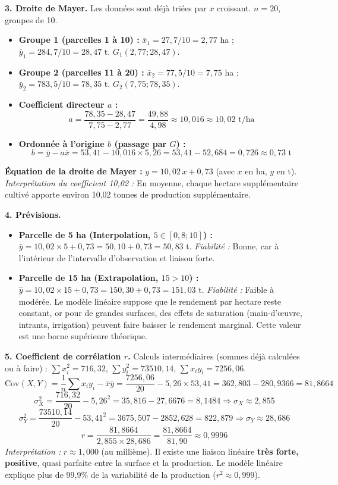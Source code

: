 \documentclass[11pt]{article}
\begin{document}
\begin{exoresolu}
\textbf{3. Droite de Mayer.}
Les données sont déjà triées par $x$ croissant. $n=20$, groupes de 10.
\begin{itemize}
    \item \textbf{Groupe 1 (parcelles 1 à 10) :}
    $\bar{x}_1 = 27,7 / 10 = 2,77$ ha ; $\bar{y}_1 = 284,7 / 10 = 28,47$ t. $G_1(2,77 ; 28,47)$.
    \item \textbf{Groupe 2 (parcelles 11 à 20) :}
    $\bar{x}_2 = 77,5 / 10 = 7,75$ ha ; $\bar{y}_2 = 783,5 / 10 = 78,35$ t. $G_2(7,75 ; 78,35)$.
    \item \textbf{Coefficient directeur $a$ :}
    \[ a = \frac{78,35 - 28,47}{7,75 - 2,77} = \frac{49,88}{4,98} \approx 10,016 \approx 10,02 \text{ t/ha} \]
    \item \textbf{Ordonnée à l'origine $b$ (passage par $G$) :}
    \[ b = \bar{y} - a\bar{x} = 53,41 - 10,016 \times 5,26 = 53,41 - 52,684 = 0,726 \approx 0,73 \text{ t} \]
\end{itemize}
\textbf{Équation de la droite de Mayer :} $\boxed{y = 10,02\,x + 0,73}$ (avec $x$ en ha, $y$ en t).
\emph{Interprétation du coefficient 10,02 :} En moyenne, chaque hectare supplémentaire cultivé apporte environ 10,02 tonnes de production supplémentaire.

\textbf{4. Prévisions.}
\begin{itemize}
    \item \textbf{Parcelle de 5 ha (Interpolation, $5 \in [0,8; 10]$) :}
    $\hat{y} = 10,02 \times 5 + 0,73 = 50,10 + 0,73 = 50,83$ t.
    \emph{Fiabilité :} Bonne, car à l'intérieur de l'intervalle d'observation et liaison forte.
    \item \textbf{Parcelle de 15 ha (Extrapolation, $15 > 10$) :}
    $\hat{y} = 10,02 \times 15 + 0,73 = 150,30 + 0,73 = 151,03$ t.
    \emph{Fiabilité :} Faible à modérée. Le modèle linéaire suppose que le rendement par hectare reste constant, or pour de grandes surfaces, des effets de saturation (main-d'œuvre, intrants, irrigation) peuvent faire baisser le rendement marginal. Cette valeur est une borne supérieure théorique.
\end{itemize}

\textbf{5. Coefficient de corrélation $r$.}
Calculs intermédiaires (sommes déjà calculées ou à faire) :
$\sum x_i^2 = 716,32$, $\sum y_i^2 = 73510,14$, $\sum x_i y_i = 7256,06$.
\[
\text{Cov}(X,Y) = \frac{1}{n}\sum x_i y_i - \bar{x}\bar{y} = \frac{7256,06}{20} - 5,26 \times 53,41 = 362,803 - 280,9366 = 81,8664
\]
\[
\sigma_X^2 = \frac{716,32}{20} - 5,26^2 = 35,816 - 27,6676 = 8,1484 \Rightarrow \sigma_X \approx 2,855
\]
\[
\sigma_Y^2 = \frac{73510,14}{20} - 53,41^2 = 3675,507 - 2852,628 = 822,879 \Rightarrow \sigma_Y \approx 28,686
\]
\[
r = \frac{81,8664}{2,855 \times 28,686} = \frac{81,8664}{81,90} \approx 0,9996
\]
\emph{Interprétation :} $r \approx 1,000$ (au millième). Il existe une liaison linéaire \textbf{très forte, positive}, quasi parfaite entre la surface et la production. Le modèle linéaire explique plus de 99,9\% de la variabilité de la production ($r^2 \approx 0,999$).


\end{exoresolu}
\end{document}
